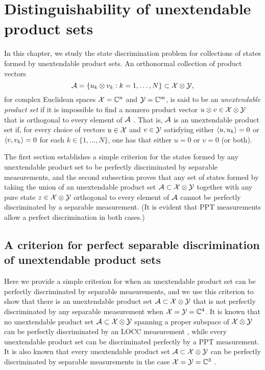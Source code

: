 \chapter{Distinguishability of unextendable product sets}
\label{chap:ups}

In this chapter, we study the state discrimination problem for collections of
states formed by unextendable product sets.
An orthonormal collection of product vectors
\begin{equation}
  \mathcal{A} = \{ u_{k}\otimes v_{k} : k = 1, \ldots, N \} \subset \mathcal{X} \otimes \mathcal{Y},
\end{equation}
for complex Euclidean spaces $\mathcal{X}=\mathbb{C}^n$ and $\mathcal{Y}=\mathbb{C}^m$, is said to be
an \emph{unextendable product set} if it is impossible to find a nonzero
product vector $u \otimes v \in \mathcal{X} \otimes \mathcal{Y}$ that is orthogonal to every
element of $\mathcal{A}$ \cite{Bennett99}.
That is, $\mathcal{A}$ is an unextendable product set if, for every choice of vectors
$u\in\mathcal{X}$ and $v\in\mathcal{Y}$ satisfying either $\langle u , u_{k}\rangle = 0$ or 
$\langle v , v_{k}\rangle = 0$ for each $k\in\{1,\ldots,N\}$, one has that either $u = 0$
or $v = 0$ (or both).

The first section establishes a simple criterion for the states formed by
any unextendable product set to be perfectly discriminated by separable
measurements, and the second subsection proves that any set of states formed
by taking the union of an unextendable product set $\mathcal{A} \subset \mathcal{X} \otimes \mathcal{Y}$ 
together with any pure state $z \in \mathcal{X}\otimes\mathcal{Y}$ orthogonal to every element of
$\mathcal{A}$ cannot be perfectly discriminated by a separable measurement.
(It is evident that PPT measurements allow a perfect discrimination in both
cases.)

\minitoc

\section{A criterion for perfect separable discrimination of
unextendable product sets}
\label{sec:criterion-sep-upb}

Here we provide a simple criterion for when an unextendable product set can be
perfectly discriminated by separable measurements, and we use this criterion to
show that there is an unextendable product set $\mathcal{A} \subset \mathcal{X}\otimes\mathcal{Y}$ that is
not perfectly discriminated by any separable measurement when
$\mathcal{X} = \mathcal{Y} = \mathbb{C}^4$.
It is known that no unextendable product set $\mathcal{A} \subset \mathcal{X}\otimes\mathcal{Y}$
spanning a proper subspace of $\mathcal{X}\otimes\mathcal{Y}$ can be perfectly discriminated by
an LOCC measurement \cite{Bennett99}, while every unextendable product
set can be discriminated perfectly by a PPT measurement.
It is also known that every unextendable product set $\mathcal{A}\subset\mathcal{X}\otimes\mathcal{Y}$ can
be perfectly discriminated by separable measurements in the case 
$\mathcal{X} = \mathcal{Y} = \mathbb{C}^3$ \cite{DiVincenzo03}.

